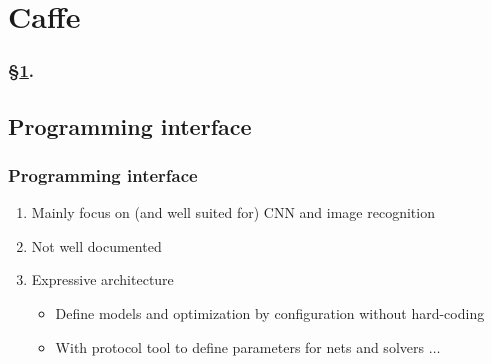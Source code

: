 
\section{Caffe}\label{sec:Caffe}


\frameinlbffalse

{

\begin{frame}[plain]
\frametitle{\S\ref{sec:Caffe}. \insertsection}
\listofframes
\end{frame}
\addtocounter{framenumber}{-1} %

}

\frameinlbftrue

\subsection{Programming interface}

\begin{frame}
  \MyLogo
  \frametitle{Programming interface}  

\begin{enumerate}
\item Mainly focus on (and well suited for) CNN and image recognition 
\item Not well documented
\item Expressive architecture 
\begin{itemize}
\item Define models and optimization by configuration without hard-coding
\item With protocol tool to define parameters for nets and solvers $\ldots$
\end{itemize}
\end{enumerate}
\end{frame}

